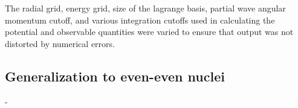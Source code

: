 The radial grid, energy grid, size of the lagrange basis, partial wave angular momentum cutoff, and
various integration cutoffs used in calculating the potential and
observable quantities were varied to ensure that output was not distorted by numerical errors. 

\subsection{Generalization to even-even nuclei}
- 

\afterpage{\clearpage}
